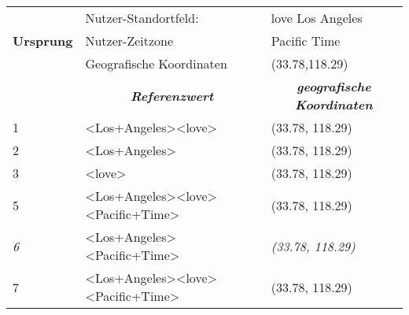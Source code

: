 				\begin{table}[h]
				\begin{tabular}{|l|l|l|}
				\hline
				\textbf{}         & Nutzer-Standortfeld:                                                                       & love Los Angeles                                                \\ \cline{2-3} 
				\textbf{Ursprung} & Nutzer-Zeitzone                                                                            & Pacific Time                                                    \\ \cline{2-3} 
				\textbf{}         & Geografische Koordinaten                                                                   & (33.78,118.29)                                                  \\ \hline
				                  & \multicolumn{1}{c|}{\textit{\textbf{Referenzwert}}}                                        & \multicolumn{1}{c|}{\textit{\textbf{geografische Koordinaten}}} \\ \hline
				1                 & \textless Los+Angeles\textgreater\textless love\textgreater                                  & (33.78, 118.29)                                                 \\ \hline
				2                 & \textless Los+Angeles\textgreater                                                           & (33.78, 118.29)                                                 \\ \hline
				3                 & \textless love\textgreater                                                                  & (33.78, 118.29)                                                 \\ \hline
				5                 & \textless Los+Angeles\textgreater\textless love\textgreater\textless Pacific+Time\textgreater & (33.78, 118.29)                                                 \\ \hline
				\textit{6}        & \textless Los+Angeles\textgreater\textless Pacific+Time\textgreater                          & \textit{(33.78, 118.29)}                                        \\ \hline
				7                 & \textless Los+Angeles\textgreater\textless love\textgreater\textless Pacific+Time\textgreater & (33.78, 118.29)                                                 \\ \hline
				\end{tabular}
				\end{table}


